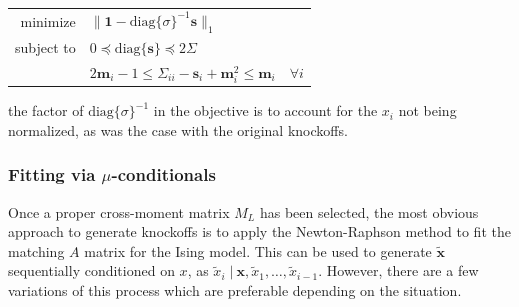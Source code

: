 \documentclass[11pt]{article}
\newcommand{\diag}[1]{\mathrm{diag}\{#1\}}
\newcommand{\st}{ \; \big | \:}
\theoremstyle{definition}
\begin{document}
            \begin{center}
                \begin{tabular}{r l}
                    minimize & $\|\mathbf 1-\diag{\sigma}^{-1}\mathbf s\|_1$ \\
                    subject to & $ 0 \preceq \diag{\mathbf s} \preceq 2\Sigma $ \\
                               & $ 2\mathbf m_i -1 \leq \Sigma_{ii}-\mathbf s_i + \mathbf m_i^2 \leq \mathbf m_i  \quad \forall i$
                \end{tabular} 
            \end{center} 
            the factor of $\diag{\sigma}^{-1}$ in the objective is to account for the $x_i$ not being normalized, as was the case with the original knockoffs. \par
\subsubsection{Fitting via $\mu$-conditionals}
        Once a proper cross-moment matrix $M_L$ has been selected, the most obvious approach to generate knockoffs is to apply the Newton-Raphson method to fit the matching $A$ matrix for the Ising model. This can be used to generate $\mathbf{ \tilde x}$ sequentially conditioned on $x$, as $\tilde x_i \st \mathbf x,\tilde x_1,\ldots,\tilde x_{i-1}$. However, there are a few variations of this process which are preferable depending on the situation. 
\end{document}
